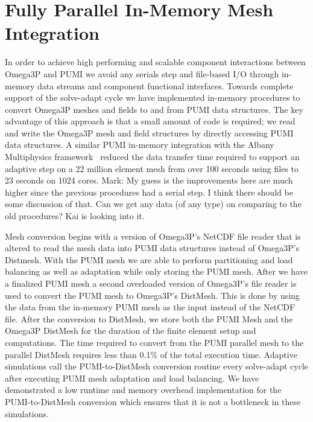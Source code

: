 \documentclass[review,12pt]{elsarticle_summary_report}
\begin{document}
\section{\label{in_memory}Fully Parallel In-Memory Mesh Integration}
In order to achieve high performing and scalable component interactions between
Omega3P and PUMI we avoid any serials step and 
file-based I/O through in-memory data streams and component functional
interfaces. Towards complete support of the solve-adapt cycle we have implemented in-memory
procedures to convert Omega3P meshes and fields to and from  PUMI data structures.
The key advantage of this approach is that a small amount of code is 
required; we read and write the Omega3P mesh and field
structures by directly accessing PUMI data structures.
A similar PUMI in-memory integration with the Albany Multiphysics
framework~\cite{Albany2015,salinger2013albany} reduced the data transfer time
required to support an adaptive step on a 22 million element mesh from over 100
seconds using files to 23 seconds on 1024 cores. \color{blue} Mark: My guess is the improvements here are much higher since the previous procedures had a serial step. I think there should be some discussion of that. Can we get any data (of any type) on comparing to the old procedures? \color{red} Kai is looking into it.\color{black} 

Mesh conversion begins with a version of Omega3P's NetCDF file reader that is altered
to read the mesh data into PUMI data structures instead of Omega3P's Distmesh. With 
the PUMI mesh we are able to perform partitioning and load balancing as well as adaptation 
while only storing the PUMI mesh. After we have a finalized PUMI mesh a second 
overloaded version of Omega3P's file reader is used to convert the PUMI mesh to 
Omega3P's DistMesh. This is done by using the data from the in-memory PUMI mesh as the 
input instead of the NetCDF file. After the conversion to DistMesh, we store both the
PUMI Mesh and the Omega3P DistMesh for the duration of the finite element setup and 
computations. The time required to convert from the PUMI parallel mesh to the
parallel DistMesh requires less than 0.1\% of the total execution time.
Adaptive simulations call the PUMI-to-DistMesh conversion routine every
solve-adapt cycle after executing PUMI mesh adaptation and load balancing.
We have demonstrated a low runtime and memory overhead implementation for the
PUMI-to-DistMesh conversion which ensures that it is not a bottleneck
in these simulations.
\end{document}
